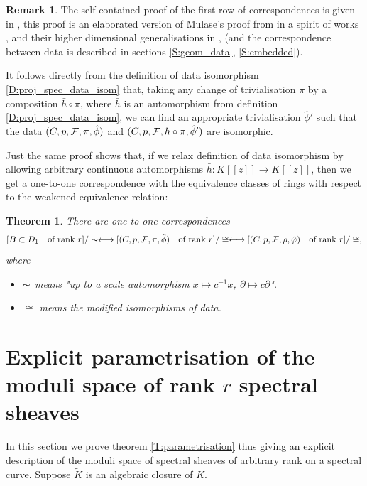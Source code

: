 \documentclass[11pt]{article}
\theoremstyle{definition}
\newtheorem{rem}{Remark}[section]
\theoremstyle{plain}
\newtheorem{theorem}{Theorem}[section]
\numberwithin{equation}{section}
\newcommand{\cf}{{{\cal F}}}
\begin{document}
\begin{rem}
\label{R:proof_explanations}
The self contained proof of the first row of correspondences is given in \cite[Ch. 9, 10]{Zheglov_book}, this proof is an elaborated version of Mulase's proof from \cite{Mu} in a spirit of works \cite{Parshin2001}, \cite{Os}  and their  higher dimensional generalisations in \cite{Zheglov2013}, \cite{KOZ2014} (and the correspondence between data is described in sections \ref{S:geom_data}, \ref{S:embedded}).  

It follows directly from the definition of data isomorphism \ref{D:proj_spec_data_isom} that, taking any change of trivialisation $\pi$ by a composition $\bar{h}\circ \pi$, where $\bar{h}$ is an automorphism from definition \ref{D:proj_spec_data_isom}, we can find an appropriate trivialisation $\hat{\phi}'$ such that the data $(C,p,\cf ,\pi , \hat{\phi} )$ and $(C,p,\cf ,\bar{h}\circ \pi , \hat{\phi}' )$ are isomorphic. 

Just the same proof shows that, if we relax definition of data isomorphism by allowing arbitrary continuous automorphisms $\bar{h}: K[[z]]\rightarrow K[[z]]$, then we get a one-to-one correspondence with the equivalence classes of rings with respect to the weakened equivalence relation: 
\end{rem}

\begin{theorem}
\label{T:classif3}
There are  one-to-one correspondences
$$
[B\subset {D_1}\mbox{\quad of rank $r$}]/\thicksim  \longleftrightarrow  [(C,p,\cf , \pi , \hat{\phi} )\mbox{\quad of rank $r$}]/\cong \longleftrightarrow  [(C,p,\cf , \rho , \hat{\varphi} )\mbox{\quad of rank $r$}]/\cong ,
$$
where 
\begin{itemize}
\item
$\thicksim$ means "up to a scale automorphism $x\mapsto c^{-1}x$, $\partial\mapsto c\partial$".
\item $\cong$ means the modified isomorphisms of data. 
\end{itemize}
\end{theorem}




\section{Explicit parametrisation of the moduli space of rank $r$ spectral sheaves}
\label{S:moduli}


In this section we prove theorem \ref{T:parametrisation} thus 
giving an explicit description of the moduli space of spectral sheaves of arbitrary rank on a spectral curve. Suppose $\tilde{K}$ is an algebraic closure of $K$. 
\end{document}
